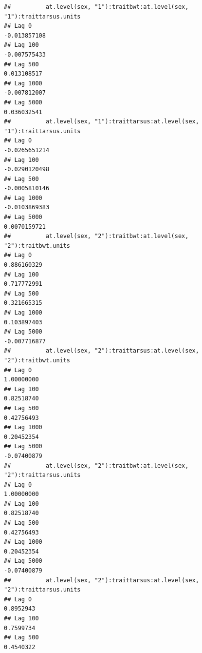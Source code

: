 \documentclass[
  12pt,
]{book}
\begin{document}
\begin{verbatim}
##          at.level(sex, "1"):traitbwt:at.level(sex, "1"):traittarsus.units
## Lag 0                                                        -0.013857108
## Lag 100                                                      -0.007575433
## Lag 500                                                       0.013108517
## Lag 1000                                                     -0.007812007
## Lag 5000                                                      0.036032541
##          at.level(sex, "1"):traittarsus:at.level(sex, "1"):traittarsus.units
## Lag 0                                                          -0.0265651214
## Lag 100                                                        -0.0290120498
## Lag 500                                                        -0.0005810146
## Lag 1000                                                       -0.0103869383
## Lag 5000                                                        0.0070159721
##          at.level(sex, "2"):traitbwt:at.level(sex, "2"):traitbwt.units
## Lag 0                                                      0.886160329
## Lag 100                                                    0.717772991
## Lag 500                                                    0.321665315
## Lag 1000                                                   0.103897403
## Lag 5000                                                  -0.007716877
##          at.level(sex, "2"):traittarsus:at.level(sex, "2"):traitbwt.units
## Lag 0                                                          1.00000000
## Lag 100                                                        0.82518740
## Lag 500                                                        0.42756493
## Lag 1000                                                       0.20452354
## Lag 5000                                                      -0.07400879
##          at.level(sex, "2"):traitbwt:at.level(sex, "2"):traittarsus.units
## Lag 0                                                          1.00000000
## Lag 100                                                        0.82518740
## Lag 500                                                        0.42756493
## Lag 1000                                                       0.20452354
## Lag 5000                                                      -0.07400879
##          at.level(sex, "2"):traittarsus:at.level(sex, "2"):traittarsus.units
## Lag 0                                                              0.8952943
## Lag 100                                                            0.7599734
## Lag 500                                                            0.4540322

\end{verbatim}
\end{document}
